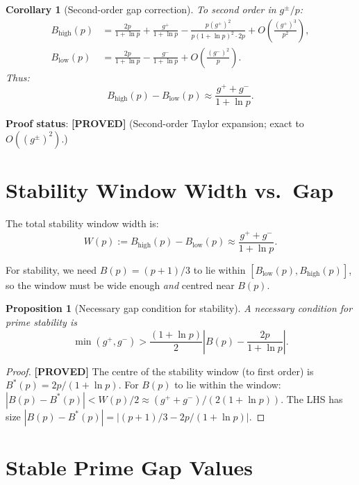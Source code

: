\documentclass[11pt,a4paper]{article}
\newtheorem{proposition}{Proposition}
\newtheorem{corollary}{Corollary}
\newcommand{\proved}[1]{\textbf{[PROVED]} #1}
\begin{document}
\begin{corollary}[Second-order gap correction]
  To second order in $g^\pm/p$:
  \begin{align*}
    B_\mathrm{high}(p) &= \frac{2p}{1+\ln p}
      + \frac{g^+}{1+\ln p}
      - \frac{p(g^+)^2}{p(1+\ln p)^2 \cdot 2p}
      + O\!\left(\frac{(g^+)^3}{p^2}\right), \\
    B_\mathrm{low}(p) &= \frac{2p}{1+\ln p}
      - \frac{g^-}{1+\ln p}
      + O\!\left(\frac{(g^-)^2}{p}\right).
  \end{align*}
  Thus:
  \[
    B_\mathrm{high}(p) - B_\mathrm{low}(p) \approx \frac{g^+ + g^-}{1+\ln p}.
  \]
\end{corollary}

\textbf{Proof status}: \proved{} (Second-order Taylor expansion; exact to $O((g^\pm)^2)$.)

\section{Stability Window Width vs.\ Gap}

The total stability window width is:
\[
  W(p) := B_\mathrm{high}(p) - B_\mathrm{low}(p) \approx \frac{g^+ + g^-}{1+\ln p}.
\]

For stability, we need $B(p) = (p+1)/3$ to lie within $[B_\mathrm{low}(p), B_\mathrm{high}(p)]$,
so the window must be wide enough \emph{and} centred near $B(p)$.

\begin{proposition}[Necessary gap condition for stability]
  A necessary condition for prime stability is
  \[
    \min(g^+, g^-) > \frac{(1+\ln p)}{2}\left|B(p) - \frac{2p}{1+\ln p}\right|.
  \]
\end{proposition}

\begin{proof}
  \proved{}
  The centre of the stability window (to first order) is $B^*(p) = 2p/(1+\ln p)$.
  For $B(p)$ to lie within the window:
  $|B(p) - B^*(p)| < W(p)/2 \approx (g^+ + g^-)/(2(1+\ln p))$.
  The LHS has size $|B(p) - B^*(p)| = |(p+1)/3 - 2p/(1+\ln p)|$.
\end{proof}

\section{Stable Prime Gap Values}
\end{document}
